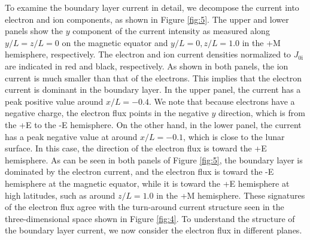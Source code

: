 \documentclass[draft,jgrga]{agutex2015}
\begin{document}
\begin{article}
To examine the boundary layer current in detail, 
we decompose the current into electron and ion components,  
as shown in Figure \ref{fig:5}. 
The upper and lower panels show the $y$ component 
of the current intensity as 
measured along $y/L=z/L=0$ on the magnetic equator 
and $y/L=0, z/L=1.0$ in the +M hemisphere, respectively.
The electron and ion current densities normalized to $J_\mathrm{0i}$ are 
indicated in red and black, respectively. 
As shown in both panels, 
the ion current is much smaller than that of the electrons. 
This implies that the electron current is dominant in the boundary layer.
In the upper panel,
the current has a peak positive value around $x/L=-0.4$. 
We note that because electrons have a negative charge, the 
electron flux points in the negative $y$ direction, which is 
from the +E to the -E hemisphere. 
On the other hand, in the lower panel, 
the current has a peak negative value at around $x/L=-0.1$, 
which is close to the lunar surface. 
In this case, the direction of the electron flux is toward the +E hemisphere.  
As can be seen in both panels of Figure \ref{fig:5}, 
the boundary layer is dominated by the electron current, 
and the electron flux is
toward the -E hemisphere at the magnetic equator, while
it is toward the +E hemisphere at high latitudes, such as 
around $z/L =1.0$ in the +M hemisphere.
These signatures of the electron flux agree with the
turn-around current structure seen in the three-dimensional space 
shown in Figure \ref{fig:4}.
To understand the structure of the boundary layer current, 
we now consider the electron flux in different planes.



\end{article}
\end{document}
